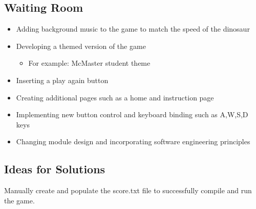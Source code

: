 \documentclass[12pt]{article}
\begin{document}
\subsection{Waiting Room}
\begin{itemize}
 \item Adding background music to the game to match the speed of the dinosaur
 \item Developing a themed version of the game 
 \begin{itemize}
     \item For example: McMaster student theme
 \end{itemize}
 \item Inserting a play again button
 \item Creating additional pages such as a home and instruction page 
 \item Implementing new button control and keyboard binding such as A,W,S,D keys
 \item Changing module design and incorporating software engineering principles
\end{itemize}
\subsection{Ideas for Solutions}
Manually create and populate the score.txt file to successfully compile and run the game.
\end{document}
